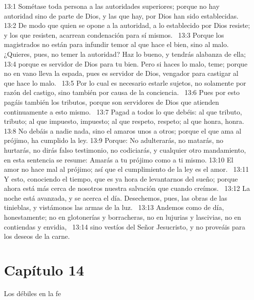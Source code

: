 13:1 Sométase toda persona a las autoridades superiores; porque no hay autoridad sino de parte de Dios, y las que hay, por Dios han sido establecidas.  
13:2 De modo que quien se opone a la autoridad, a lo establecido por Dios resiste; y los que resisten, acarrean condenación para sí mismos.  
13:3 Porque los magistrados no están para infundir temor al que hace el bien, sino al malo. ¿Quieres, pues, no temer la autoridad? Haz lo bueno, y tendrás alabanza de ella;  
13:4 porque es servidor de Dios para tu bien. Pero si haces lo malo, teme; porque no en vano lleva la espada, pues es servidor de Dios, vengador para castigar al que hace lo malo.  
13:5 Por lo cual es necesario estarle sujetos, no solamente por razón del castigo, sino también por causa de la conciencia.  
13:6 Pues por esto pagáis también los tributos, porque son servidores de Dios que atienden continuamente a esto mismo.  
13:7 Pagad a todos lo que debéis: al que tributo, tributo; al que impuesto, impuesto; al que respeto, respeto; al que honra, honra. 
13:8 No debáis a nadie nada, sino el amaros unos a otros; porque el que ama al prójimo, ha cumplido la ley. 
13:9 Porque: No adulterarás, no matarás, no hurtarás, no dirás falso testimonio, no codiciarás, y cualquier otro mandamiento, en esta sentencia se resume: Amarás a tu prójimo como a ti mismo. 
13:10 El amor no hace mal al prójimo; así que el cumplimiento de la ley es el amor.  
13:11 Y esto, conociendo el tiempo, que es ya hora de levantarnos del sueño; porque ahora está más cerca de nosotros nuestra salvación que cuando creímos.  
13:12 La noche está avanzada, y se acerca el día. Desechemos, pues, las obras de las tinieblas, y vistámonos las armas de la luz.  
13:13 Andemos como de día, honestamente; no en glotonerías y borracheras, no en lujurias y lascivias, no en contiendas y envidia,  
13:14 sino vestíos del Señor Jesucristo, y no proveáis para los deseos de la carne.  
\section*{Capítulo 14 }
Los débiles en la fe 

